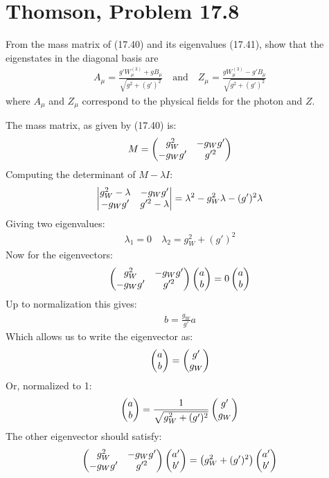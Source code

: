 \documentclass[12pt]{article}
\begin{document}
\section{Thomson, Problem 17.8}
\begin{problem}
  From the mass matrix of (17.40) and its eigenvalues (17.41), show that the eigenstates in the diagonal basis are
  \begin{align*}
    A_\mu=\frac{g' W_\mu^{(3)}+gB_\mu}{\sqrt{g^2+(g')^2}}\quad\text{and}\quad
    Z_\mu=\frac{g W_\mu^{(3)}-g'B_\mu}{\sqrt{g^2+(g')^2}}
  \end{align*}
  where $A_\mu$ and $Z_\mu$ correspond to the physical fields for the photon and $Z$. 
\end{problem}
The mass matrix, as given by (17.40) is:
\begin{align*}
  M=\pmqty{g_W^2&-g_W g'\\-g_W g'& g'^2}
\end{align*}
Computing the determinant of $M-\lambda I$:
\begin{align*}
  \vmqty{g_W^2-\lambda&-g_W g'\\-g_W g'& g'^2-\lambda}
  =\lambda^2-g_W^2\lambda-(g')^2\lambda
\end{align*}
Giving two eigenvalues:
\begin{align*}
  \lambda_1=0\quad\lambda_2=g_W^2+(g')^2
\end{align*}
Now for the eigenvectors:
\begin{align*}
  \pmqty{g_W^2&-g_W g'\\-g_W g'& g'^2}\pmqty{a\\b}=0\pmqty{a\\b}
\end{align*}
Up to normalization this gives:
\begin{align*}
  b=\frac{g_W}{g'}a
\end{align*}
Which allows us to write the eigenvector as:
\begin{align*}
  \pmqty{a\\b}=\pmqty{g'\\g_W}
\end{align*}
Or, normalized to 1:
\begin{align*}
  \pmqty{a\\b}=\frac1{\sqrt{g_W^2+(g')^2}}\pmqty{g'\\g_W}
\end{align*}
The other eigenvector should satisfy:
\begin{align*}
  \pmqty{g_W^2&-g_W g'\\-g_W g'& g'^2}\pmqty{a'\\b'}
  =\qty(g_W^2+(g')^2)\pmqty{a'\\b'}
\end{align*}
\end{document}
